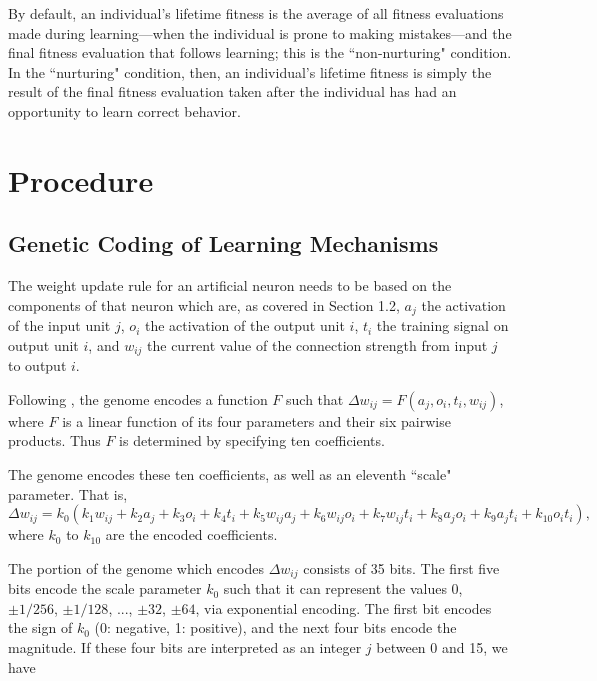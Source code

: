 \documentclass[master]{outhesis}
\begin{document}
By default, an individual's lifetime fitness is the average of all fitness evaluations made during learning---when the individual is prone to making mistakes---and the final fitness evaluation that follows learning; this is the ``non-nurturing" condition.
In the ``nurturing" condition, then, an individual's lifetime fitness is simply the result of the final fitness evaluation taken after the individual has had an opportunity to learn correct behavior.

\chapter{Procedure}

\section{Genetic Coding of Learning Mechanisms}

The weight update rule for an artificial neuron needs to be based on the components of that neuron which are, as covered in Section 1.2, $a_j$ the activation of the input unit $j$, $o_i$ the activation of the output unit $i$, $t_i$ the training signal on output unit $i$, and $w_{ij}$ the current value of the connection strength from input $j$ to output $i$.

Following \cite{Chalmers:1990aa}, the genome encodes a function $F$ such that $\Delta w_{ij} = F(a_j, o_i, t_i, w_{ij})$, where $F$ is a linear function of its four parameters and their six pairwise products. Thus $F$ is determined by specifying ten coefficients.

The genome encodes these ten coefficients, as well as an eleventh ``scale" parameter. That is,
\[
	\Delta w_{ij} = k_0(k_1w_{ij}+k_2a_j+k_3o_i+k_4t_i+k_5w_{ij}a_j+k_6w_{ij}o_i+k_7w_{ij}t_{i}+k_8a_jo_i+k_9a_jt_i+k_{10}o_it_i),
\]
where $k_0$ to $k_{10}$ are the encoded coefficients.

The portion of the genome which encodes $\Delta w_{ij}$ consists of 35 bits. The first five bits encode the scale parameter $k_0$ such that it can represent the values $0$, $\pm 1/256$, $\pm 1/128$, ..., $\pm 32$, $\pm 64$, via exponential encoding. The first bit encodes the sign of $k_0$ (0: negative, 1: positive), and the next four bits encode the magnitude. If these four bits are interpreted as an integer $j$ between 0 and 15, we have
\end{document}
